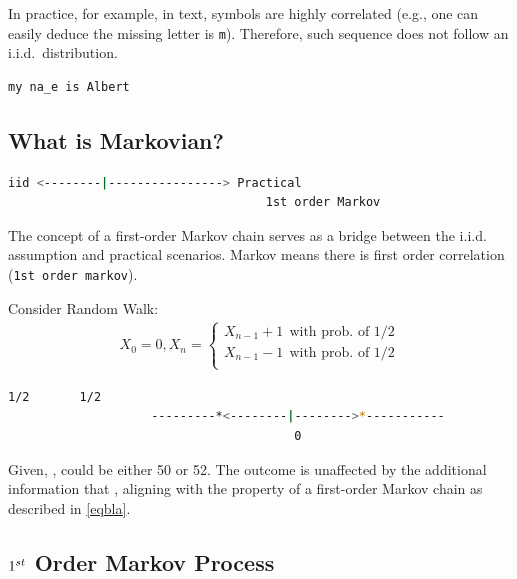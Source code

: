 \documentclass{article}
\newcommand{\mn}[1]{\mathnormal{#1}}
\newcommand\mm[1]{\noindent{${{#1}}$}}
\begin{document}
In practice, for example, in text, symbols are highly correlated (e.g., one can easily deduce the missing letter is \texttt{m}). 
Therefore, such sequence does not follow an i.i.d.~distribution.
\begin{lstlisting}[language=bash, basicstyle=\large\ttfamily]
                        my na_e is Albert
\end{lstlisting}

\subsection{What is Markovian?}
\begin{lstlisting}[language=bash, basicstyle=\small\ttfamily]
                        iid <--------|----------------> Practical
                                    1st order Markov  
\end{lstlisting}

The concept of a first-order Markov chain serves as a bridge between the i.i.d. assumption and practical scenarios. 
Markov means there is first order correlation ({\tt 1st order markov}).

\begin{example}
Consider Random Walk:
\begin{align*}
X_0=0, X_n = \begin{cases}
    X_{n-1}+1 ~~ \text{with prob. of 1/2} \\
    X_{n-1}-1 ~~ \text{with prob. of 1/2}\\
    \end{cases}  
\end{align*}
\begin{lstlisting}[language=bash, basicstyle=\small\ttfamily]
                                 1/2       1/2
                    ---------*<--------|-------->*-----------
                                        0  
\end{lstlisting}
Given, \mm{X_{101} = 51}, \mm{X_{102}} could be either 50 or 52. The outcome is unaffected by the additional information that \mm{X_{100}=50}, aligning with the property of a first-order Markov chain as described in \cref{eqbla}. 
\end{example}



\subsection{$1^\mn{st}$ Order Markov Process}
\end{document}
